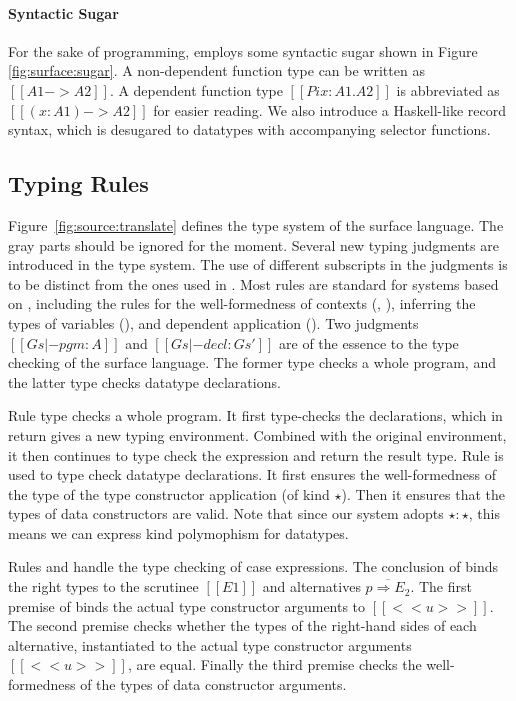 \paragraph{Syntactic Sugar}
For the sake of programming, \sufcc employs some syntactic sugar
shown in Figure \ref{fig:surface:sugar}. A
non-dependent function type can be written as $[[A1 -> A2]]$. A
dependent function type $[[Pi x : A1 . A2]]$ is abbreviated as
$[[(x : A1) -> A2]]$ for easier reading. We also introduce a
Haskell-like record syntax, which is desugared to datatypes with
accompanying selector functions.


\subsection{Typing Rules}
Figure~\ref{fig:source:translate} defines the type system of the
surface language. The gray parts should be ignored for the moment. Several new
typing judgments are introduced in the type system. The use of
different subscripts in the judgments is to be distinct from the ones
used in \name. Most rules are standard for systems based on \coc,
including the rules for the well-formedness of contexts
(, ), inferring the types of
variables (), and dependent application
(). Two judgments $[[Gs |- pgm : A]]$ and
$[[Gs |- decl : Gs']]$ are of the essence to the type checking of the
surface language. The former type checks a whole program, and the
latter type checks datatype declarations.

Rule  type checks a whole program. It first
type-checks the declarations, which in return gives a new typing
environment. Combined with the original environment, it then continues
to type check the expression and return the result type. Rule
 is used to type check datatype declarations. It
first ensures the well-formedness of the type of the type constructor
application (of kind $\star$). Then it ensures that the types of
data constructors are valid.  Note that since our system adopts $\star
: \star$, this means we can express kind polymophism for datatypes.

Rules  and  handle the type
checking of case expressions. The conclusion of 
binds the right types to the scrutinee $[[E1]]$ and alternatives
$\overline{p \Rightarrow E_2}$. The first premise of
 binds the actual type constructor arguments to
$[[<<u>>]]$. The second premise checks whether the types of the
right-hand sides of each alternative, instantiated to the actual type
constructor arguments $[[<<u>>]]$, are equal. Finally the third
premise checks the well-formedness of the types of data constructor
arguments.

